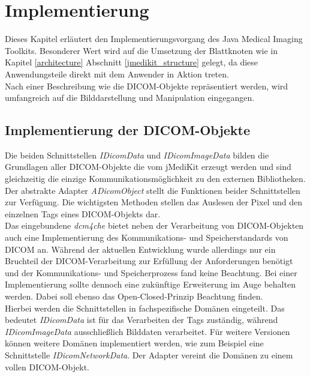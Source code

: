 \chapter{Implementierung} \label{implementation}

Dieses Kapitel erläutert den Implementierungsvorgang des Java Medical Imaging Toolkits. Besonderer Wert wird auf die Umsetzung der Blattknoten wie in Kapitel \ref{architecture} Abschnitt \ref{jmedikit_structure} gelegt, da diese Anwendungsteile direkt mit dem Anwender in Aktion treten.\\
Nach einer Beschreibung wie die DICOM-Objekte repräsentiert werden, wird umfangreich auf die Bilddarstellung und Manipulation eingegangen.

\FloatBarrier
\section{Implementierung der DICOM-Objekte}

Die beiden Schnittstellen \textit{IDicomData} und \textit{IDicomImageData} bilden die Grundlagen aller DICOM-Objekte die vom jMediKit erzeugt werden und sind gleichzeitig die einzige Kommunikationsmöglichkeit zu den externen Bibliotheken. Der abstrakte Adapter \textit{ADicomObject} stellt die Funktionen beider Schnittstellen zur Verfügung. Die wichtigsten Methoden stellen das Auslesen der Pixel und den einzelnen Tags eines DICOM-Objekts dar. \\
Das eingebundene \textit{dcm4che} bietet neben der Verarbeitung von DICOM-Objekten auch eine Implementierung des Kommunikations- und Speicherstandards von DICOM an. Während der aktuellen Entwicklung wurde allerdings nur ein Bruchteil der DICOM-Verarbeitung zur Erfüllung der Anforderungen benötigt und der Kommunikations- und Speicherprozess fand keine Beachtung. Bei einer Implementierung sollte dennoch eine zukünftige Erweiterung im Auge behalten werden. Dabei soll ebenso das Open-Closed-Prinzip Beachtung finden.\\
Hierbei werden die Schnittstellen in fachspezifische Domänen eingeteilt. Das bedeutet \textit{IDicomData} ist für das Verarbeiten der Tags zuständig, während \textit{IDicomImageData} ausschließlich Bilddaten verarbeitet. Für weitere Versionen können weitere Domänen implementiert werden, wie zum Beispiel eine Schnittstelle \textit{IDicomNetworkData}. Der Adapter vereint die Domänen zu einem vollen DICOM-Objekt. 

\FloatBarrier
